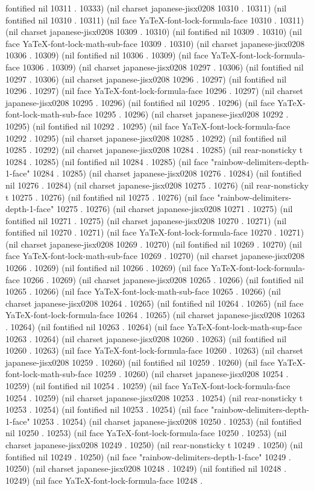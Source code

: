fontified nil 10311 . 10333) (nil charset japanese-jisx0208 10310 . 10311) (nil fontified nil 10310 . 10311) (nil face YaTeX-font-lock-formula-face 10310 . 10311) (nil charset japanese-jisx0208 10309 . 10310) (nil fontified nil 10309 . 10310) (nil face YaTeX-font-lock-math-sub-face 10309 . 10310) (nil charset japanese-jisx0208 10306 . 10309) (nil fontified nil 10306 . 10309) (nil face YaTeX-font-lock-formula-face 10306 . 10309) (nil charset japanese-jisx0208 10297 . 10306) (nil fontified nil 10297 . 10306) (nil charset japanese-jisx0208 10296 . 10297) (nil fontified nil 10296 . 10297) (nil face YaTeX-font-lock-formula-face 10296 . 10297) (nil charset japanese-jisx0208 10295 . 10296) (nil fontified nil 10295 . 10296) (nil face YaTeX-font-lock-math-sub-face 10295 . 10296) (nil charset japanese-jisx0208 10292 . 10295) (nil fontified nil 10292 . 10295) (nil face YaTeX-font-lock-formula-face 10292 . 10295) (nil charset japanese-jisx0208 10285 . 10292) (nil fontified nil 10285 . 10292) (nil charset japanese-jisx0208 10284 . 10285) (nil rear-nonsticky t 10284 . 10285) (nil fontified nil 10284 . 10285) (nil face "rainbow-delimiters-depth-1-face" 10284 . 10285) (nil charset japanese-jisx0208 10276 . 10284) (nil fontified nil 10276 . 10284) (nil charset japanese-jisx0208 10275 . 10276) (nil rear-nonsticky t 10275 . 10276) (nil fontified nil 10275 . 10276) (nil face "rainbow-delimiters-depth-1-face" 10275 . 10276) (nil charset japanese-jisx0208 10271 . 10275) (nil fontified nil 10271 . 10275) (nil charset japanese-jisx0208 10270 . 10271) (nil fontified nil 10270 . 10271) (nil face YaTeX-font-lock-formula-face 10270 . 10271) (nil charset japanese-jisx0208 10269 . 10270) (nil fontified nil 10269 . 10270) (nil face YaTeX-font-lock-math-sub-face 10269 . 10270) (nil charset japanese-jisx0208 10266 . 10269) (nil fontified nil 10266 . 10269) (nil face YaTeX-font-lock-formula-face 10266 . 10269) (nil charset japanese-jisx0208 10265 . 10266) (nil fontified nil 10265 . 10266) (nil face YaTeX-font-lock-math-sub-face 10265 . 10266) (nil charset japanese-jisx0208 10264 . 10265) (nil fontified nil 10264 . 10265) (nil face YaTeX-font-lock-formula-face 10264 . 10265) (nil charset japanese-jisx0208 10263 . 10264) (nil fontified nil 10263 . 10264) (nil face YaTeX-font-lock-math-sup-face 10263 . 10264) (nil charset japanese-jisx0208 10260 . 10263) (nil fontified nil 10260 . 10263) (nil face YaTeX-font-lock-formula-face 10260 . 10263) (nil charset japanese-jisx0208 10259 . 10260) (nil fontified nil 10259 . 10260) (nil face YaTeX-font-lock-math-sub-face 10259 . 10260) (nil charset japanese-jisx0208 10254 . 10259) (nil fontified nil 10254 . 10259) (nil face YaTeX-font-lock-formula-face 10254 . 10259) (nil charset japanese-jisx0208 10253 . 10254) (nil rear-nonsticky t 10253 . 10254) (nil fontified nil 10253 . 10254) (nil face "rainbow-delimiters-depth-1-face" 10253 . 10254) (nil charset japanese-jisx0208 10250 . 10253) (nil fontified nil 10250 . 10253) (nil face YaTeX-font-lock-formula-face 10250 . 10253) (nil charset japanese-jisx0208 10249 . 10250) (nil rear-nonsticky t 10249 . 10250) (nil fontified nil 10249 . 10250) (nil face "rainbow-delimiters-depth-1-face" 10249 . 10250) (nil charset japanese-jisx0208 10248 . 10249) (nil fontified nil 10248 . 10249) (nil face YaTeX-font-lock-formula-face 10248 . 